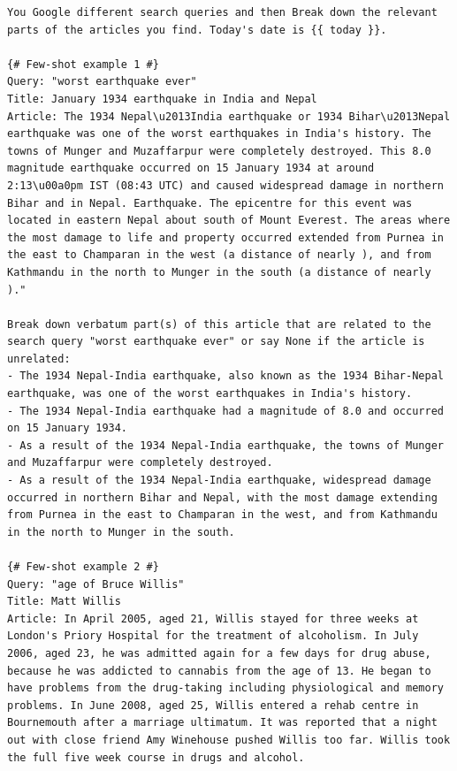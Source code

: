 \documentclass[11pt]{article}
\begin{document}
\begin{table}
\begin{lstlisting}[basicstyle=\ttfamily\small]
You Google different search queries and then Break down the relevant parts of the articles you find. Today's date is {{ today }}.

{# Few-shot example 1 #}
Query: "worst earthquake ever"
Title: January 1934 earthquake in India and Nepal 
Article: The 1934 Nepal\u2013India earthquake or 1934 Bihar\u2013Nepal earthquake was one of the worst earthquakes in India's history. The towns of Munger and Muzaffarpur were completely destroyed. This 8.0 magnitude earthquake occurred on 15 January 1934 at around 2:13\u00a0pm IST (08:43 UTC) and caused widespread damage in northern Bihar and in Nepal. Earthquake. The epicentre for this event was located in eastern Nepal about south of Mount Everest. The areas where the most damage to life and property occurred extended from Purnea in the east to Champaran in the west (a distance of nearly ), and from Kathmandu in the north to Munger in the south (a distance of nearly )."

Break down verbatum part(s) of this article that are related to the search query "worst earthquake ever" or say None if the article is unrelated:
- The 1934 Nepal-India earthquake, also known as the 1934 Bihar-Nepal earthquake, was one of the worst earthquakes in India's history.
- The 1934 Nepal-India earthquake had a magnitude of 8.0 and occurred on 15 January 1934.
- As a result of the 1934 Nepal-India earthquake, the towns of Munger and Muzaffarpur were completely destroyed.
- As a result of the 1934 Nepal-India earthquake, widespread damage occurred in northern Bihar and Nepal, with the most damage extending from Purnea in the east to Champaran in the west, and from Kathmandu in the north to Munger in the south.

{# Few-shot example 2 #}
Query: "age of Bruce Willis"
Title: Matt Willis
Article: In April 2005, aged 21, Willis stayed for three weeks at London's Priory Hospital for the treatment of alcoholism. In July 2006, aged 23, he was admitted again for a few days for drug abuse, because he was addicted to cannabis from the age of 13. He began to have problems from the drug-taking including physiological and memory problems. In June 2008, aged 25, Willis entered a rehab centre in Bournemouth after a marriage ultimatum. It was reported that a night out with close friend Amy Winehouse pushed Willis too far. Willis took the full five week course in drugs and alcohol.


\end{lstlisting}
\end{table}
\end{document}
